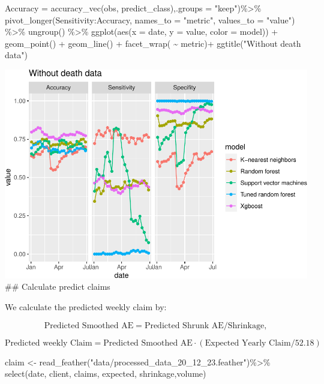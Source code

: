 \documentclass[
]{article}
\newenvironment{Shaded}{\begin{snugshade}}{\end{snugshade}}
\newcommand{\AttributeTok}[1]{\textcolor[rgb]{0.77,0.63,0.00}{#1}}
\newcommand{\FunctionTok}[1]{\textcolor[rgb]{0.00,0.00,0.00}{#1}}
\newcommand{\NormalTok}[1]{#1}
\newcommand{\OtherTok}[1]{\textcolor[rgb]{0.56,0.35,0.01}{#1}}
\newcommand{\SpecialCharTok}[1]{\textcolor[rgb]{0.00,0.00,0.00}{#1}}
\newcommand{\StringTok}[1]{\textcolor[rgb]{0.31,0.60,0.02}{#1}}
\begin{document}
\begin{Shaded}
\begin{Highlighting}[]
            \AttributeTok{Accuracy =} \FunctionTok{accuracy\_vec}\NormalTok{(obs, predict\_class),}\AttributeTok{.groups =} \StringTok{"keep"}\NormalTok{)}\SpecialCharTok{\%\textgreater{}\%}
  \FunctionTok{pivot\_longer}\NormalTok{(Sensitivity}\SpecialCharTok{:}\NormalTok{Accuracy, }\AttributeTok{names\_to =} \StringTok{"metric"}\NormalTok{, }\AttributeTok{values\_to =} \StringTok{"value"}\NormalTok{) }\SpecialCharTok{\%\textgreater{}\%}
  \FunctionTok{ungroup}\NormalTok{() }\SpecialCharTok{\%\textgreater{}\%}
  \FunctionTok{ggplot}\NormalTok{(}\FunctionTok{aes}\NormalTok{(}\AttributeTok{x =}\NormalTok{ date, }\AttributeTok{y =}\NormalTok{ value, }\AttributeTok{color =}\NormalTok{ model)) }\SpecialCharTok{+}
  \FunctionTok{geom\_point}\NormalTok{() }\SpecialCharTok{+}
  \FunctionTok{geom\_line}\NormalTok{() }\SpecialCharTok{+}
  \FunctionTok{facet\_wrap}\NormalTok{( }\SpecialCharTok{\textasciitilde{}}\NormalTok{ metric)}\SpecialCharTok{+}
  \FunctionTok{ggtitle}\NormalTok{(}\StringTok{"Without death data"}\NormalTok{)}
\end{Highlighting}
\end{Shaded}

\includegraphics{figures/report/fig-unnamed-chunk-82-3.pdf} \#\#
Calculate predict claims

We calculate the predicted weekly claim by:

\[
\text{Predicted Smoothed AE} = \text{Predicted Shrunk AE} / \text{Shrinkage},
\]

\[
\text{Predicted weekly Claim} = \text{Predicted Smoothed AE} \cdot (\text{Expected Yearly Claim} /52.18 )
\]

\begin{Shaded}
\begin{Highlighting}[]
\NormalTok{claim }\OtherTok{\textless{}{-}} \FunctionTok{read\_feather}\NormalTok{(}\StringTok{"data/processed\_data\_20\_12\_23.feather"}\NormalTok{)}\SpecialCharTok{\%\textgreater{}\%}
  \FunctionTok{select}\NormalTok{(date, client, claims, expected, shrinkage,volume)}
\end{Highlighting}
\end{Shaded}
\end{document}
